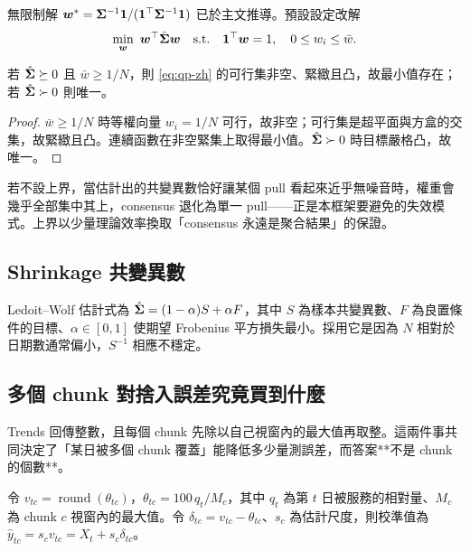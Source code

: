 \documentclass[12pt,a4paper,oneside]{article}
\begin{document}
無限制解 $\bm{w}^*=\bm{\Sigma}^{-1}\bm{1}/(\bm{1}^\top\bm{\Sigma}^{-1}\bm{1})$ 已於主文推導。預設設定改解
\begin{equation}
\min_{\wvec}\ \wvec^\top\hat{\Sig}\wvec
\quad\text{s.t.}\quad
\one^\top\wvec=1,\quad
0\le w_i\le\bar{w}.
\label{eq:qp-zh}
\end{equation}

\begin{proposition}[受限問題適定]
若 $\hat{\bm{\Sigma}}\succeq 0$ 且 $\bar{w}\ge 1/N$，則 \eqref{eq:qp-zh} 的可行集非空、緊緻且凸，故最小值存在；若 $\hat{\bm{\Sigma}}\succ 0$ 則唯一。
\end{proposition}

\begin{proof}
$\bar{w}\ge 1/N$ 時等權向量 $w_i=1/N$ 可行，故非空；可行集是超平面與方盒的交集，故緊緻且凸。連續函數在非空緊集上取得最小值。$\hat{\bm{\Sigma}}\succ 0$ 時目標嚴格凸，故唯一。
\end{proof}

\begin{remark}
若不設上界，當估計出的共變異數恰好讓某個 pull 看起來近乎無噪音時，權重會幾乎全部集中其上，consensus 退化為單一 pull——正是本框架要避免的失效模式。上界以少量理論效率換取「consensus 永遠是聚合結果」的保證。
\end{remark}

\subsection{Shrinkage 共變異數}

Ledoit--Wolf 估計式為 $\hat{\bm{\Sigma}}=(1-\alpha)S+\alpha F$，其中 $S$ 為樣本共變異數、$F$ 為良置條件的目標、$\alpha\in[0,1]$ 使期望 Frobenius 平方損失最小。採用它是因為 $N$ 相對於日期數通常偏小，$S^{-1}$ 相應不穩定。

\subsection{多個 chunk 對捨入誤差究竟買到什麼}\label{app:rounding-zh}

Trends 回傳整數，且每個 chunk 先除以自己視窗內的最大值再取整。這兩件事共同決定了「某日被多個 chunk 覆蓋」能降低多少量測誤差，而答案**不是 chunk 的個數**。

令 $v_{tc}=\operatorname{round}(\theta_{tc})$，$\theta_{tc}=100\,q_t/M_c$，其中 $q_t$ 為第 $t$ 日被服務的相對量、$M_c$ 為 chunk $c$ 視窗內的最大值。令 $\delta_{tc}=v_{tc}-\theta_{tc}$、$s_c$ 為估計尺度，則校準值為 $\hat{y}_{tc}=s_c v_{tc}=X_t+s_c\delta_{tc}$。
\end{document}
